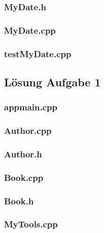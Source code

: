 \subsubsection{MyDate.h}

\subsubsection{MyDate.cpp}

\subsubsection{testMyDate.cpp}


\setcounter{section}{5}
\setcounter{subsection}{1}


\subsection{Lösung Aufgabe 1}
\subsubsection{appmain.cpp}

\subsubsection{Author.cpp}

\subsubsection{Author.h}

\subsubsection{Book.cpp}

\subsubsection{Book.h}

\subsubsection{MyTools.cpp}

